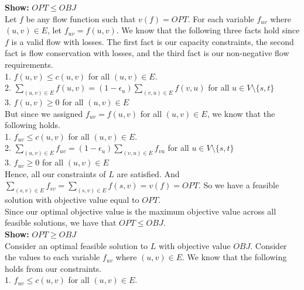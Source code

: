 \documentclass[12pt]{article}
\begin{document}
\textbf{Show:} $OPT \leq OBJ$ \\

Let $f$ be any flow function such that $v(f) = OPT$. For each variable $f_{uv}$ where $(u,v) \in E$, let $f_{uv} = f(u,v)$. We know that the following three facts hold since $f$ is a valid flow with losses. The first fact is our capacity constraints, the second fact is flow conservation with losses, and the third fact is our non-negative flow requirements.  \\

1. $f(u,v) \leq c(u,v)$ for all $(u,v) \in E$. \\

2. $\sum\limits_{(u,v) \in E} f(u,v) = (1-\epsilon_u)\sum\limits_{(v,u) \in E} f(v,u)$ for all  $u \in V \setminus \{s,t\}$ \\

3. $f(u,v) \geq 0$ for all $(u,v) \in E$ \\

But since we assigned $f_{uv} = f(u,v)$ for all $(u,v) \in E$, we know that the following holds. \\

1. $f_{uv} \leq c(u,v)$ for all $(u,v) \in E$. \\

2. $\sum\limits_{(u,v) \in E} f_{uv} = (1-\epsilon_u)\sum\limits_{(v,u) \in E} f_{vu}$ for all  $u \in V \setminus \{s,t\}$ \\

3. $f_{uv} \geq 0$ for all $(u,v) \in E$ \\

Hence, all our constraints of $L$ are satisfied. And $\sum\limits_{(s,v) \in E}f_{sv} = \sum\limits_{(s,v) \in E}f(s,v) = v(f) = OPT$. So we have a feasible solution with objective value equal to $OPT$. \\

Since our optimal objective value is the maximum objective value across all feasible solutions, we have that $OPT \leq OBJ$. \\

\textbf{Show:} $OPT \geq OBJ$ \\

Consider an optimal feasible solution to $L$ with objective value $OBJ$. Consider the values to each variable $f_{uv}$ where $(u,v) \in E$. We know that the following holds from our constraints. \\

1. $f_{uv} \leq c(u,v)$ for all $(u,v) \in E$. \\
\end{document}
